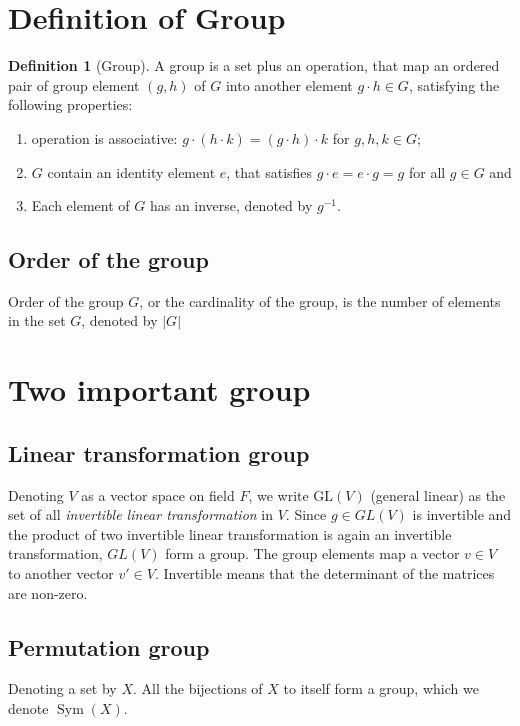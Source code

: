 \documentclass{amsart}
\theoremstyle{remark}
\theoremstyle{remark}
\theoremstyle{definition}
\newtheorem*{definition}{Definition}
\DeclareMathOperator{\Sym}{Sym}
\begin{document}
\vspace{10pt}
\section*{Definition of Group}
\begin{definition}[Group]
    A group is a set plus an operation, that map an ordered pair of group element $(g,h)$ of $G$ into another element $g\cdot h \in G$, satisfying
    the following properties:
    \begin{enumerate}
        \item operation is associative: $g\cdot (h \cdot k) = (g\cdot h) \cdot k$ for $g,h,k \in G$;
        \item $G$ contain an identity element $e$, that satisfies $g\cdot e = e\cdot g = g$ for all $g \in G$ and 
        \item Each element of $G$ has an inverse, denoted by $g^{-1}$.
    \end{enumerate}  
\end{definition}

\subsection*{Order of the group}
    Order of the group $G$, or the cardinality of the group, is the number of elements in the set $G$, denoted by $|G|$


\vspace{10pt}
\section*{Two important group}

\subsection*{Linear transformation group}
Denoting $V$ as a vector space on field $F$, we write $\text{GL}(V)$ (general linear) as the set of all \emph{invertible linear transformation} in $V$. 
Since $g\in GL(V)$ is invertible and the product of two invertible linear transformation is again an invertible transformation, $GL(V)$ 
form a group. The group elements map a vector $v\in V$ to another vector $v' \in V$. Invertible means that the determinant of the 
matrices are non-zero.

\subsection*{Permutation group}
Denoting a set by $X$. All the bijections of $X$ to itself form a group, which we denote $\Sym(X)$. 
\end{document}
